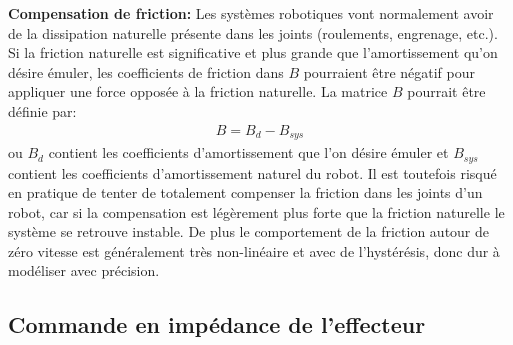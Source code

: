\textbf{Compensation de friction: } Les systèmes robotiques vont normalement avoir de la dissipation naturelle présente dans les joints (roulements, engrenage, etc.). Si la friction naturelle est significative et plus grande que l'amortissement qu'on désire émuler, les coefficients de friction dans $B$ pourraient être négatif pour appliquer une force opposée à la friction naturelle. La matrice $B$ pourrait être définie par:
\begin{align}
B = B_{d} - B_{sys}
\end{align}
ou $B_{d}$ contient les coefficients d'amortissement que l'on désire émuler et $B_{sys}$ contient les coefficients d'amortissement naturel du robot. Il est toutefois risqué en pratique de tenter de totalement compenser la friction dans les joints d'un robot, car si la compensation est légèrement plus forte que la friction naturelle le système se retrouve instable. De plus le comportement de la friction autour de zéro vitesse est généralement très non-linéaire et avec de l'hystérésis, donc dur à modéliser avec précision. 



\subsection{Commande en impédance de l'effecteur}
\label{sec:effimpcontrol}

